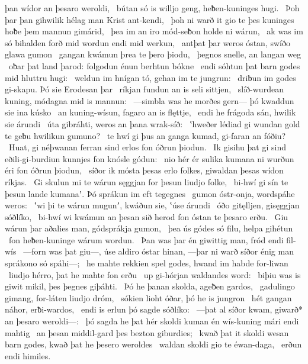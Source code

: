 þan wídor an þesaro weroldi, \hld\ bútan só is willjo geng,
heƀen-kuninges hugi. \hld\ Þoh þar þan gihwilik hélag man
Krist ant-kendi, \hld\ þoh ni warð it gio te þes kuninges hoƀe
þem mannun gimárid, \hld\ þea im an iro mód-seƀon
holde ni wárun, \hld\ ak was im só bihalden forð
mid wordun endi mid werkun, \hld\ antþat þar weros óstan,
swíðo glawa gumon \hld\ gangan kwámun
þrea te þero þiodu, \hld\ þegnos snelle,
an langan weg \hld\ oƀar þat land þarod:
folgodun énun berhtun bókne \hld\ endi sóhtun þat barn godes
mid hluttru hugi: \hld\ weldun im hnígan tó,
gehan im te jungrun: \hld\ driƀun im godes gi-skapu.
Þó sie Erodesan þar \hld\ ríkjan fundun
an is seli sittjen, \hld\ slíð-wurdean kuning,
módagna mid is mannun: \hld\ —simbla was he morðes gern—
þó kwaddun sie ina kúsko \hld\ an kuning-wísun,
fagaro an is flęttje, \hld\ endi he frágoda sán,
hwilik sie árundi \hld\ úta gibráhti,
weros an þana wrak-síð: \hld\ ʽhweðer lédiad gi wundan gold
te geƀu hwilikun gumuno? \hld\ te hwí gi þus an ganga kumad,
gi-faran an fóðiu? \hld\ Huat, gi néþwanan ferran sind
erlos fon óðrun þiodun. \hld\ Ik gisihu þat gi sind eðili-gi-burdiun
kunnjes fon knósle gódun: \hld\ nio hér ér sulika kumana ni wurðun
éri fon óðrun þiodun, \hld\ síðor ik mósta þesas erlo folkes,
giwaldan þesas wídon ríkjas. \hld\ Gi skulun mi te wárun sęggjan
for þesun liudjo folke, \hld\ bi-hwí gi sín te þesun lande kumanaʼ.
Þó sprákun im eft tegegnes \hld\ gumon óstr-onja,
wordspáhe weros: \hld\ ʽwi þi te wárun mugunʼ, kwáðun sie,
ʽúse árundi \hld\ óðo gitęlljen,
gisęggjan sóðlíko, \hld\ bi-hwí wi kwámun an þesan sið herod
fon óstan te þesaro erðu. \hld\ Giu wárun þar aðalies man,
gódsprákja gumon, \hld\ þea ús gódes só filu,
helpa gihétun \hld\ fon heƀen-kuninge
wárum wordun. \hld\ Þan was þar én giwittig man,
fród endi fil-wís \hld\ —forn was þat giu—,
úse aldiro óstar hinan, —þar ni warð síðor énig man
sprákono só spáhi—; \hld\ he mahte rekkien spel godes,
hwand im habde for-liwan \hld\ liudjo hérro,
þat he mahte fon erðu \hld\ up gi-hórjan
waldandes word: \hld\ biþiu was is giwit mikil,
þes þegnes giþáhti. \hld\ Þó he þanan skolda,
ageƀen gardos, \hld\ gadulingo gimang,
for-láten liudjo dróm, \hld\ sókien lioht óðar,
þó he is jungron \hld\ hét gangan náhor,
erƀi-wardos, \hld\ endi is erlun þó
sagde sóðlíko: \hld\ —þat al síðor kwam,
giwarð* an þesaro weroldi—: \hld\ þó sagda he þat hér skoldi kuman én wís-kuning
mári endi mahtig \hld\ an þesan middil-gard
þes bezton giburdies; \hld\ kwað þat it skoldi wesan barn godes,
kwað þat he þesero weroldes \hld\ waldan skoldi
gio te éwan-daga, \hld\ erðun endi himiles.
